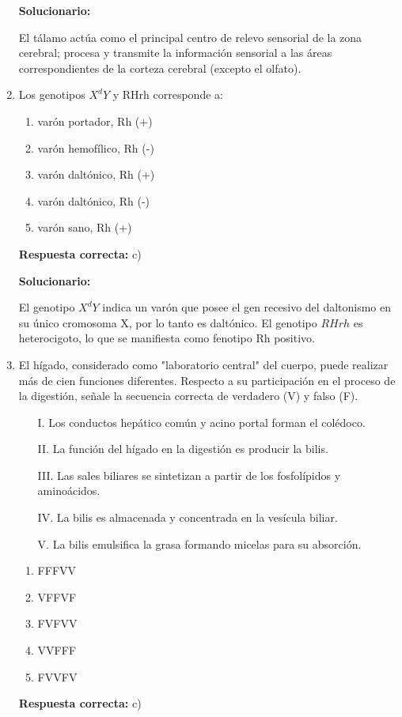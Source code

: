 \begin{enumerate}[resume]
	\vspace{2mm}
	\textbf{Solucionario:}

	El tálamo actúa como el principal centro de relevo sensorial de la zona cerebral; procesa y transmite la información sensorial a las áreas correspondientes de la corteza cerebral (excepto el olfato).

	\vspace{6mm}

	\item Los genotipos $X^dY$ y RHrh corresponde a:
	\begin{enumerate}[label=\alph*)]
		\item varón portador, Rh (+)
		\item varón hemofílico, Rh (-)
		\item varón daltónico, Rh (+)
		\item varón daltónico, Rh (-)
		\item varón sano, Rh (+)
	\end{enumerate}
	\textbf{Respuesta correcta:} c)

	\vspace{2mm}
	\textbf{Solucionario:}

	El genotipo $X^dY$ indica un varón que posee el gen recesivo del daltonismo en su único cromosoma X, por lo tanto es daltónico. El genotipo $RHrh$ es heterocigoto, lo que se manifiesta como fenotipo Rh positivo.

	\vspace{6mm}

	\item El hígado, considerado como "laboratorio central" del cuerpo, puede realizar más de cien funciones diferentes. Respecto a su participación en el proceso de la digestión, señale la secuencia correcta de verdadero (V) y falso (F).
	\begin{itemize}
		\item[I.] Los conductos hepático común y acino portal forman el colédoco.
		\item[II.] La función del hígado en la digestión es producir la bilis.
		\item[III.] Las sales biliares se sintetizan a partir de los fosfolípidos y aminoácidos.
		\item[IV.] La bilis es almacenada y concentrada en la vesícula biliar.
		\item[V.] La bilis emulsifica la grasa formando micelas para su absorción.
	\end{itemize}
	\begin{enumerate}[label=\alph*)]
		\item FFFVV
		\item VFFVF
		\item FVFVV
		\item VVFFF
		\item FVVFV
	\end{enumerate}
	\textbf{Respuesta correcta:} c)


\end{enumerate}
